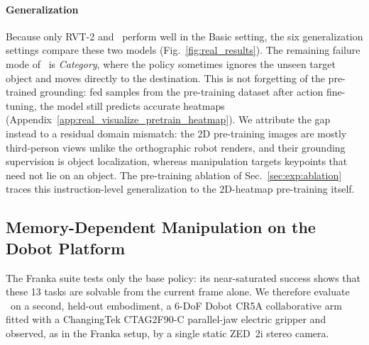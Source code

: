 \paragraph{Generalization}
Because only RVT-2 and \method\ perform well in the Basic setting, the
six generalization settings compare these two models
(Fig.~\ref{fig:real_results}).
The remaining failure mode of \method\ is \emph{Category}, where the
policy sometimes ignores the unseen target object and moves directly
to the destination.
This is not forgetting of the pre-trained grounding: fed samples from
the pre-training dataset after action fine-tuning, the model still
predicts accurate heatmaps
(Appendix~\ref{app:real_visualize_pretrain_heatmap}).
We attribute the gap instead to a residual domain mismatch: the 2D
pre-training images are mostly third-person views unlike the
orthographic robot renders, and their grounding supervision is object
localization, whereas manipulation targets keypoints that need not lie
on an object.
The pre-training ablation of Sec.~\ref{sec:exp:ablation} traces this
instruction-level generalization to the 2D-heatmap pre-training
itself.

\subsection{Memory-Dependent Manipulation on the Dobot Platform}
\label{app:real_dobot}

The Franka suite tests only the base policy: its near-saturated success
shows that these 13 tasks are solvable from the current frame alone.
We therefore evaluate \memmethod\ on a second, held-out embodiment, a
6-DoF Dobot CR5A collaborative arm fitted with a ChangingTek
CTAG2F90-C parallel-jaw electric gripper and observed, as in the Franka
setup, by a single static ZED~2i stereo camera.

